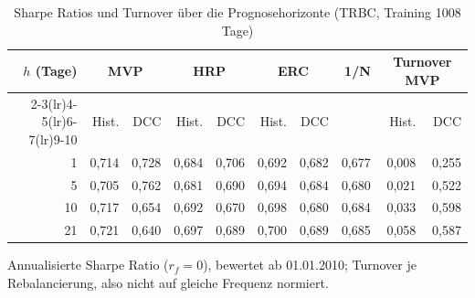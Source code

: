 \begin{table}[htbp]
  \centering
  \footnotesize
  \begin{tabular}{rrrrrrrrrr}
    \toprule
    $h$ (Tage) & \multicolumn{2}{c}{MVP} & \multicolumn{2}{c}{HRP} & \multicolumn{2}{c}{ERC} & 1/N & \multicolumn{2}{c}{Turnover MVP} \\
    \cmidrule(lr){2-3}\cmidrule(lr){4-5}\cmidrule(lr){6-7}\cmidrule(lr){9-10}
     & Hist. & DCC & Hist. & DCC & Hist. & DCC & & Hist. & DCC \\
    \midrule
    1 & 0,714 & 0,728 & 0,684 & 0,706 & 0,692 & 0,682 & 0,677 & 0,008 & 0,255 \\
    5 & 0,705 & 0,762 & 0,681 & 0,690 & 0,694 & 0,684 & 0,680 & 0,021 & 0,522 \\
    10 & 0,717 & 0,654 & 0,692 & 0,670 & 0,698 & 0,680 & 0,684 & 0,033 & 0,598 \\
    21 & 0,721 & 0,640 & 0,697 & 0,689 & 0,700 & 0,689 & 0,685 & 0,058 & 0,587 \\
    \bottomrule
  \end{tabular}
  \caption{Sharpe Ratios und Turnover über die Prognosehorizonte (TRBC, Training 1008 Tage)}
  \label{tab:sharpe_horizont}
  \begin{minipage}{\linewidth}\vspace{0.4em}\centering\footnotesize
  Annualisierte Sharpe Ratio ($r_f=0$), bewertet ab 01.01.2010; Turnover je Rebalancierung, also nicht auf gleiche Frequenz normiert.
  \end{minipage}
\end{table}
